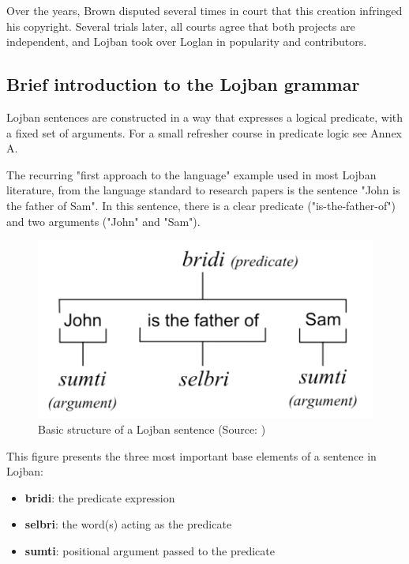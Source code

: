 Over the years, Brown disputed several times in court that this creation infringed his copyright. Several trials later, all courts agree that both projects are independent,
and Lojban took over Loglan in popularity and contributors.

\subsection{Brief introduction to the Lojban grammar}

Lojban sentences are constructed in a way that expresses a logical predicate, with a fixed set of arguments. For a small
refresher course in predicate logic see Annex A.\newline

The recurring "first approach to the language" example used in most Lojban literature, from the language standard to research papers
is the sentence "John is the father of Sam". In this sentence, there is a clear predicate ("is-the-father-of") and two arguments
("John" and "Sam").

\begin{figure}[H]
\centering
\includegraphics[scale=0.20]{images/lojban_grammar.png}
\caption{Basic structure of a Lojban sentence (Source: \cite{cowan1997complete})}
\end{figure}

This figure presents the three most important base elements of a sentence in Lojban:

\begin{itemize}
    \item \textbf{bridi}: the predicate expression
    \item \textbf{selbri}: the word(s) acting as the predicate
    \item \textbf{sumti}: positional argument passed to the predicate
\end{itemize}

